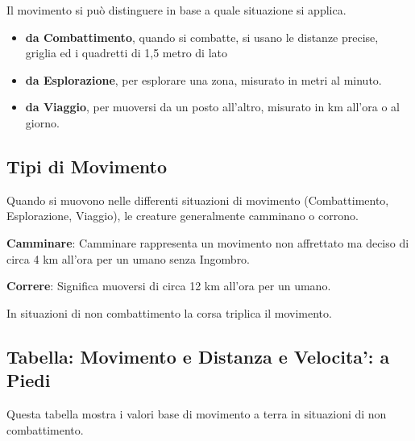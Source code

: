 \documentclass[12pt,a4paper,twoside,openany]{book}
\begin{document}
\begin{multicols}{2}

Il movimento si può distinguere in base a quale situazione si applica.

\medskip

\begin{itemize}
\item \textbf{da Combattimento}, quando si combatte, si usano le distanze precise, griglia ed i quadretti di 1,5 metro di lato
\item \textbf{da Esplorazione}, per esplorare una zona, misurato in metri al minuto.
\item \textbf{da Viaggio}, per muoversi da un posto all'altro, misurato in km all'ora o al giorno.
\end{itemize}

\subsection{Tipi di Movimento}\label{tipodimovimento}

Quando si muovono nelle differenti situazioni di movimento (Combattimento, Esplorazione, Viaggio), le creature generalmente camminano o corrono.

\textbf{Camminare}: Camminare rappresenta un movimento non affrettato ma deciso di circa 4 km all'ora per un umano senza Ingombro.

\textbf{Correre}: Significa muoversi di circa 12 km all'ora per un umano.

In situazioni di non combattimento la corsa triplica il movimento.

\subsection{Tabella: Movimento e Distanza e Velocita': a Piedi}

Questa tabella mostra i valori base di movimento a terra in situazioni di non combattimento.

\bigskip


\end{multicols}
\end{document}
